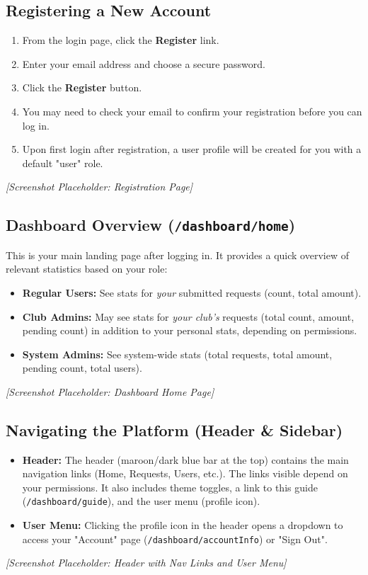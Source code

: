 \documentclass{article}
\begin{document}
\subsection{Registering a New Account}
\begin{enumerate}
    \item From the login page, click the \textbf{Register} link.
    \item Enter your email address and choose a secure password.
    \item Click the \textbf{Register} button.
    \item You may need to check your email to confirm your registration before you can log in.
    \item Upon first login after registration, a user profile will be created for you with a default "user" role.
\end{enumerate}
\textit{[Screenshot Placeholder: Registration Page]}

\subsection{Dashboard Overview (\texttt{/dashboard/home})}
This is your main landing page after logging in. It provides a quick overview of relevant statistics based on your role:
\begin{itemize}
    \item \textbf{Regular Users:} See stats for \textit{your} submitted requests (count, total amount).
    \item \textbf{Club Admins:} May see stats for \textit{your club's} requests (total count, amount, pending count) in addition to your personal stats, depending on permissions.
    \item \textbf{System Admins:} See system-wide stats (total requests, total amount, pending count, total users).
\end{itemize}
\textit{[Screenshot Placeholder: Dashboard Home Page]}

\subsection{Navigating the Platform (Header \& Sidebar)}
\begin{itemize}
    \item \textbf{Header:} The header (maroon/dark blue bar at the top) contains the main navigation links (Home, Requests, Users, etc.). The links visible depend on your permissions. It also includes theme toggles, a link to this guide (\texttt{/dashboard/guide}), and the user menu (profile icon).
    \item \textbf{User Menu:} Clicking the profile icon in the header opens a dropdown to access your "Account" page (\texttt{/dashboard/accountInfo}) or "Sign Out".
\end{itemize}
\textit{[Screenshot Placeholder: Header with Nav Links and User Menu]}
\end{document}
